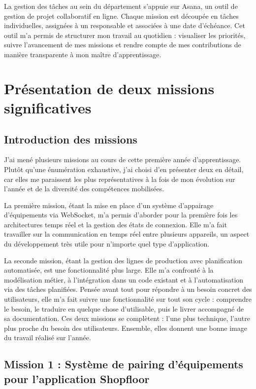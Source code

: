 \documentclass[pe1a]{tnreport} %
\begin{document}
La gestion des tâches au sein du département s'appuie sur Asana,
un outil de gestion de projet collaboratif en ligne. Chaque mission est
découpée en tâches individuelles, assignées à un responsable et associées
à une date d'échéance. Cet outil m'a permis de structurer mon travail au
quotidien : visualiser les priorités, suivre l'avancement de mes missions et
rendre compte de mes contributions de manière transparente à mon maître
d'apprentissage.

\cleardoublepage

\chapter{Présentation de deux missions significatives}

\section{Introduction des missions}

J'ai mené plusieurs missions au cours de cette première année d'apprentissage. 
Plutôt qu'une énumération exhaustive, j'ai choisi d'en présenter deux en 
détail, car elles me paraissent les plus représentatives à la fois de mon 
évolution sur l'année et de la diversité des compétences mobilisées.

La première mission, étant la mise en place d'un système d'appairage 
d'équipements via \gls{WebSocket}, m'a permis d'aborder pour la première fois 
les architectures temps réel et la gestion des états de connexion. 
Elle m'a fait travailler sur la communication en temps réel entre 
plusieurs appareils, un aspect du développement très utile pour n'importe quel type d'application.

La seconde mission, étant la gestion des lignes de production avec planification 
automatisée, est une fonctionnalité plus large. Elle m'a confronté à la 
modélisation métier, à l'intégration dans un code existant et à 
l'automatisation via des tâches planifiées. Pensée avant tout pour répondre 
à un besoin concret des utilisateurs, elle m'a fait suivre une fonctionnalité 
sur tout son cycle : comprendre le besoin, le traduire en quelque chose 
d'utilisable, puis le livrer accompagné de sa documentation.
Ces deux missions se complètent : l'une plus technique, l'autre plus 
proche du besoin des utilisateurs. Ensemble, elles donnent une bonne 
image du travail réalisé sur l'année.

\section{Mission 1 : Système de pairing d'équipements pour l'application Shopfloor}
\end{document}

